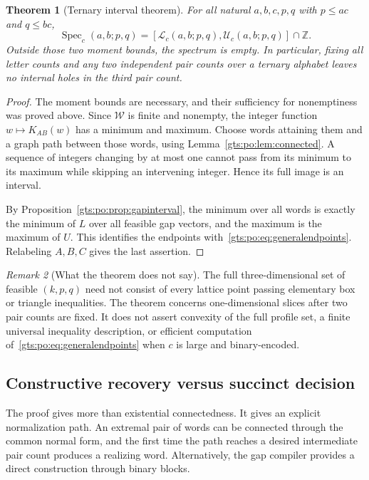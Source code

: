 \documentclass[11pt,letterpaper]{article}
\newtheorem{theorem}{Theorem}[section]
\theoremstyle{definition}
\theoremstyle{remark}
\newtheorem{remark}[theorem]{Remark}
\newcommand{\Z}{\mathbb Z}
\newcommand{\Spec}{\operatorname{Spec}}
\newcommand{\low}{\mathcal L}
\newcommand{\up}{\mathcal U}
\begin{document}
\begin{theorem}[Ternary interval theorem]\label{gts:po:thm:interval}
For all natural $a,b,c,p,q$ with $p\le ac$ and $q\le bc$,
\begin{equation}\label{gts:po:eq:interval}
 \Spec_c(a,b;p,q)
 = [\low_c(a,b;p,q),\up_c(a,b;p,q)]\cap\Z.
\end{equation}
Outside those two moment bounds, the spectrum is empty. In particular, fixing all letter counts and any two independent pair counts over a ternary alphabet leaves no internal holes in the third pair count.
\end{theorem}
\begin{proof}
The moment bounds are necessary, and their sufficiency for nonemptiness was proved above. Since $\mathcal W$ is finite and nonempty, the integer function $w\mapsto K_{AB}(w)$ has a minimum and maximum. Choose words attaining them and a graph path between those words, using Lemma~\ref{gts:po:lem:connected}. A sequence of integers changing by at most one cannot pass from its minimum to its maximum while skipping an intervening integer. Hence its full image is an interval.

By Proposition~\ref{gts:po:prop:gapinterval}, the minimum over all words is exactly the minimum of $L$ over all feasible gap vectors, and the maximum is the maximum of $U$. This identifies the endpoints with~\eqref{gts:po:eq:generalendpoints}. Relabeling $A,B,C$ gives the last assertion.
\end{proof}

\begin{remark}[What the theorem does not say]
The full three-dimensional set of feasible $(k,p,q)$ need not consist of every lattice point passing elementary box or triangle inequalities. The theorem concerns one-dimensional slices after two pair counts are fixed. It does not assert convexity of the full profile set, a finite universal inequality description, or efficient computation of~\eqref{gts:po:eq:generalendpoints} when $c$ is large and binary-encoded.
\end{remark}

\subsection{Constructive recovery versus succinct decision}
The proof gives more than existential connectedness. It gives an explicit normalization path. An extremal pair of words can be connected through the common normal form, and the first time the path reaches a desired intermediate pair count produces a realizing word. Alternatively, the gap compiler provides a direct construction through binary blocks.
\end{document}
